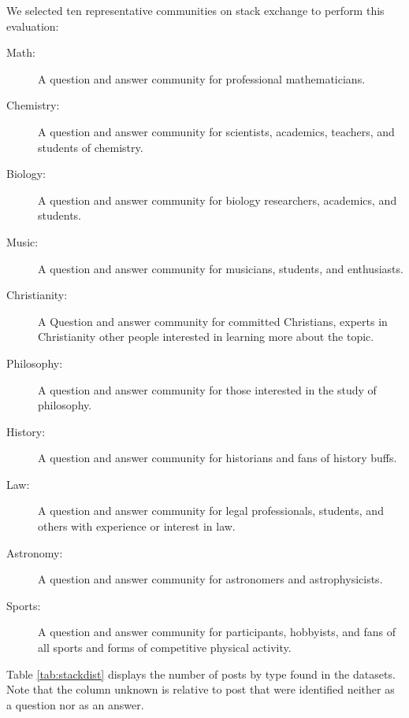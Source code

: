 We selected ten representative communities on stack exchange to perform this evaluation: 

\begin{description}
\item [Math:] A question and answer community for professional mathematicians.
\item [Chemistry:] A question and answer community for scientists, academics, teachers, and students of chemistry.
\item [Biology:] A question and answer community for biology researchers, academics, and students.
\item [Music:]  A question and answer community for musicians, students, and enthusiasts. 
\item [Christianity:] A Question and answer community for committed Christians, experts in Christianity other people interested in learning more about the topic.
\item [Philosophy:]  A question and answer community for those interested in the study of philosophy.
\item [History:] A question and answer community for historians and fans of history buffs.
\item [Law:] A question and answer community for legal professionals, students, and others with experience or interest in law.

\item [Astronomy:] A question and answer community for astronomers and astrophysicists. 

\item[Sports:] A question and answer community for participants, hobbyists, and fans of all sports and forms of competitive physical activity.
\end{description}


Table \ref{tab:stackdist} displays the number of posts by type found in the datasets. Note that the column unknown is relative to post that were identified neither as a question nor as an answer. 


